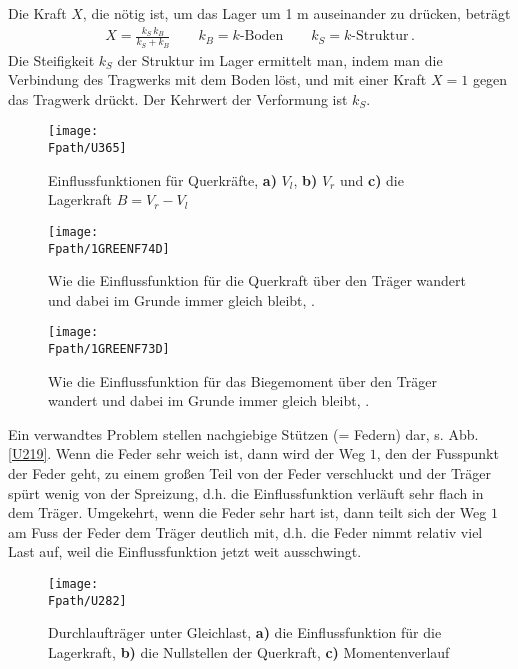 Die Kraft $X$, die n\"{o}tig ist, um das Lager um 1 m auseinander zu dr\"{u}cken, betr\"{a}gt
\begin{align}
X = \frac{k_S\,k_B}{k_S + k_B} \qquad k_B = \text{$k$-Boden} \qquad k_S = \text{$k$-Struktur}\,.
\end{align}
Die Steifigkeit $k_S$ der Struktur im Lager ermittelt man, indem man die Verbindung des Tragwerks mit dem Boden l\"{o}st, und mit einer Kraft $X = 1$ gegen das Tragwerk dr\"{u}ckt. Der Kehrwert der Verformung ist $k_S$.
\begin{figure}[tbp]
\centering
\if {} \sidecaption \fi
\texttt{[image: \\Fpath/U365]}
\caption{Einflussfunktionen f\"{u}r Querkr\"{a}fte, \textbf{ a)} $V_l$, \textbf{ b)} $V_r$ und \textbf{ c)} die Lagerkraft $B = V_r - V_l$} \label{U365}
\end{figure}%
\begin{figure}[tbp]
\centering
\texttt{[image: \\Fpath/1GREENF74D]}
\caption{Wie die Einflussfunktion f\"{u}r die Querkraft \"{u}ber den Tr\"{a}ger wandert und dabei im Grunde immer gleich bleibt, \cite{Ha6}. }
\label{1GreenF74}%
%
\end{figure}%
\begin{figure}[tbp]
\centering
\texttt{[image: \\Fpath/1GREENF73D]}
\caption{Wie die Einflussfunktion f\"{u}r das Biegemoment \"{u}ber den Tr\"{a}ger wandert und dabei im Grunde immer gleich bleibt, \cite{Ha6}.}
\label{1GreenF73}%
%
\end{figure}%

Ein verwandtes Problem stellen nachgiebige St\"{u}tzen (= Federn) dar, s. Abb. \ref{U219}.
Wenn die Feder sehr weich ist, dann wird der Weg $1 $, den der Fusspunkt der Feder geht, zu einem gro{\ss}en Teil von der Feder verschluckt und der Tr\"{a}ger sp\"{u}rt wenig von der Spreizung, d.h. die Einflussfunktion verl\"{a}uft sehr flach in dem Tr\"{a}ger. Umgekehrt, wenn die Feder sehr hart ist, dann teilt sich der Weg $1 $ am Fuss der Feder dem Tr\"{a}ger deutlich mit, d.h. die Feder nimmt relativ viel Last auf, weil die Einflussfunktion jetzt weit ausschwingt.
\begin{figure}[tbp]
\centering
\if {} \sidecaption \fi
\texttt{[image: \\Fpath/U282]}
\caption{Durchlauftr\"{a}ger unter Gleichlast, \textbf{ a)} die Einflussfunktion f\"{u}r die Lagerkraft, \textbf{ b)} die Nullstellen der Querkraft, \textbf{ c)} Momentenverlauf } \label{U282}
\end{figure}%

